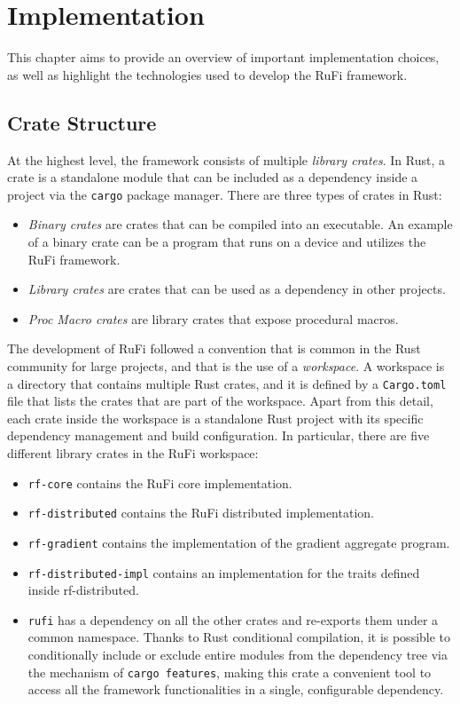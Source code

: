 
\chapter{Implementation}
\label{chap:implementation}
This chapter aims to provide an overview of important implementation choices, as well as highlight the technologies used to develop the RuFi framework.

\section{Crate Structure}
At the highest level, the framework consists of multiple \textit{library crates}. In Rust, a crate is a standalone module that can be included as a dependency inside a project via
the \texttt{cargo} package manager. There are three types of crates in Rust:

\begin{itemize}
    \item \textit{Binary crates} are crates that can be compiled into an executable.
          An example of a binary crate can be a program that runs on a device and utilizes the RuFi framework.
    \item \textit{Library crates} are crates that can be used as a dependency in other projects.
    \item \textit{Proc Macro crates} are library crates that expose procedural macros.
\end{itemize}

The development of RuFi followed a convention that is common in the Rust community for large projects, and that is the use of a \textit{workspace}.
A workspace is a directory that contains multiple Rust crates, and it is defined by a \texttt{Cargo.toml} file that lists the crates that are part of the workspace.
Apart from this detail, each crate inside the workspace is a standalone Rust project with its specific dependency management and build configuration.
In particular, there are five different library crates in the RuFi workspace:

\begin{itemize}
    \item \texttt{rf-core} contains the RuFi core implementation.
    \item \texttt{rf-distributed} contains the RuFi distributed implementation.
    \item \texttt{rf-gradient} contains the implementation of the gradient aggregate program.
    \item \texttt{rf-distributed-impl} contains an implementation for the traits defined inside rf-distributed.
    \item \texttt{rufi} has a dependency on all the other crates and re-exports them under a common namespace. Thanks to Rust conditional compilation,
          it is possible to conditionally include or exclude entire modules from the dependency tree via the mechanism of \texttt{cargo features}, making this
          crate a convenient tool to access all the framework functionalities in a single, configurable dependency.
\end{itemize}

